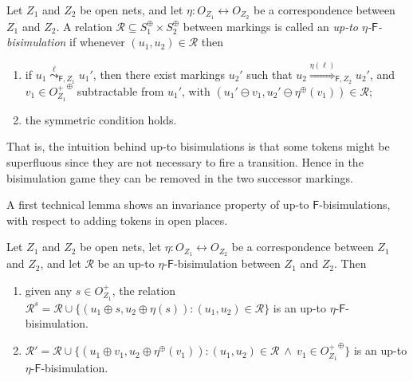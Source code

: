 \documentclass{LMCS}
\newcommand{\mon}[1]{\ensuremath{{#1}^\oplus}}
\newcommand{\monSub}[2]{\ensuremath{{#1}_{#2}^\oplus}}
\newcommand{\wltr}[3][x]{\ensuremath{\stackrel{{#3}}{\leadsto}_{\mathsf{#1},#2}}}
\newcommand{\Ltr}[3][x]{\ensuremath{\stackrel{{#3}}{\Longrightarrow}_{\mathsf{#1},#2}}}
\begin{document}
\begin{defi}
  \label{de:upto}
  Let $Z_1$ and $Z_2$ be open nets, and let $\eta : O_{Z_1}
  \leftrightarrow O_{Z_2}$ be a correspondence between $Z_1$ and $Z_2$.  A
  relation $\mathcal{R} \subseteq \monSub{S}{1} \times \monSub{S}{2}$
  between markings is called an \emph{up-to
    $\eta$-$\mathsf{F}$-bisimulation} if whenever $(u_1, u_2) \in
  \mathcal{R}$ then

  \begin{enumerate}[$\bullet$]


  \item if $u_1 \wltr[F]{Z_1}{\ell} u_1'$, then there exist
    markings $u_2'$ such
    that $u_2 \Ltr[F]{Z_2}{\eta(\ell)} u_2'$, and $v_1 \in \mon{O_{Z_1}^+}$
    subtractable from $u_1'$,
    with  $(u_1' \ominus v_1, u_2' \ominus \mon{\eta}(v_1)) \in
    \mathcal{R}$;
    
  \item the symmetric condition holds.

  \end{enumerate}
\end{defi}

That is, the intuition behind up-to bisimulations is that some tokens
might be superfluous since they are not necessary to fire a
transition. Hence in the bisimulation game they can be removed in
the two successor markings.

A first technical lemma shows an invariance property of up-to
$\mathsf{F}$-bisimulations, with respect to adding tokens in open places.

\begin{lem}
  \label{le:up-to}
  Let $Z_1$ and $Z_2$ be open nets, let $\eta : O_{Z_1} \leftrightarrow
  O_{Z_2}$ be a correspondence between $Z_1$ and $Z_2$, and let
  $\mathcal{R}$ be an up-to $\eta$-$\mathsf{F}$-bisimulation between $Z_1$ and
  $Z_2$. Then
  \begin{enumerate}[(1)]

  \item given any $s \in O_{Z_1}^+$, the relation $\mathcal{R}^s =
    \mathcal{R} \cup \{ (u_1 \oplus s, u_2 \oplus \eta(s)) : (u_1, u_2) \in
    \mathcal{R} \}$ is an up-to $\eta$-$\mathsf{F}$-bisimulation.

  \item $\mathcal{R}' = \mathcal{R} \cup \{ (u_1 \oplus v_1, u_2
    \oplus \mon{\eta}(v_1)) : (u_1, u_2) \in \mathcal{R}\ \wedge\ v_1
    \in \mon{O_{Z_1}^+} \}$ is an up-to $\eta$-$\mathsf{F}$-bisimulation.
  \end{enumerate}
\end{lem}
\end{document}
